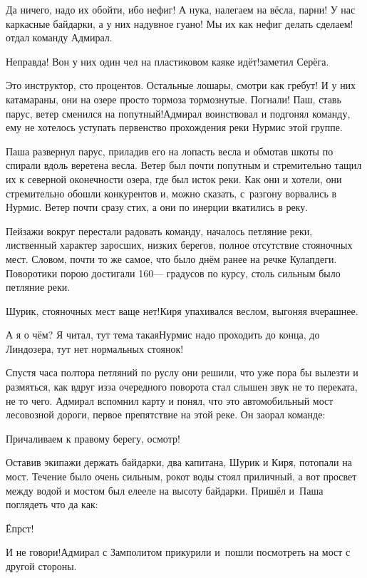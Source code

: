 \diagdash Да ничего, надо их обойти, ибо нефиг! А ну\sdash ка, налегаем на вёсла, парни! У нас каркасные байдарки, а у них надувное гуано! Мы их как нефиг делать сделаем!\mdash отдал команду Адмирал.

\diagdash Неправда! Вон у них один чел на пластиковом каяке идёт!\mdash заметил Серёга.

\diagdash Это инструктор, сто процентов. Остальные лошары, смотри как гребут! И у них катамараны, они на озере просто тормоза тормознутые. Погнали! Паш, ставь парус, ветер сменился на попутный!\mdash Адмирал воинствовал и подгонял команду, ему не хотелось уступать первенство прохождения реки Нурмис этой группе.

Паша развернул парус, приладив его на лопасть весла и обмотав шкоты по спирали вдоль веретена весла. Ветер был почти попутным и стремительно тащил их к северной оконечности озера, где был исток реки. Как они и хотели, они стремительно обошли конкурентов и, можно сказать, с~разгону ворвались в Нурмис. Ветер почти сразу стих, а они по инерции вкатились в реку.

Пейзажи вокруг перестали радовать команду, началось петляние реки, лиственный характер заросших, низких берегов, полное отсутствие стояночных мест. Словом, почти то же самое, что было днём ранее на речке Кулапдеги. Поворотики порою достигали 160\thinspace\nobreakdash--- градусов по курсу, столь сильным было петляние реки.

\diagdash Шурик, стояночных мест ваще нет!\mdash Киря упахивался веслом, выгоняя вчерашнее.

\diagdash А я о чём? Я читал, тут тема такая\mdash Нурмис надо проходить до конца, до Линдозера, тут нет нормальных стоянок!

Спустя часа полтора петляний по руслу они решили, что уже пора бы вылезти и размяться, как вдруг из\sdash за очередного поворота стал слышен звук не то переката, не то чего. Адмирал вспомнил карту и понял, что это автомобильный мост лесовозной дороги, первое препятствие на этой реке. Он заорал команде:

\diagdash Причаливаем к правому берегу, осмотр!

Оставив экипажи держать байдарки, два капитана, Шурик и Киря, потопали на мост. Течение было очень сильным, рокот воды стоял приличный, а вот просвет между водой и мостом был еле\sdash еле на высоту байдарки. Пришёл и~Паша поглядеть что да как:

\diagdash Ёпрст!

\diagdash И не говори!\mdash Адмирал с Замполитом прикурили и~пошли посмотреть на мост с другой стороны.

